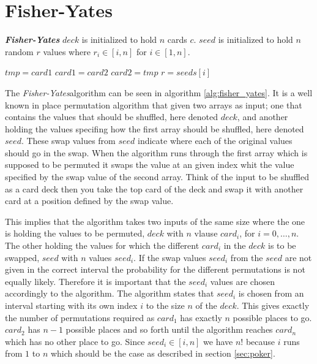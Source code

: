 \documentclass[twoside,11pt,openright]{report}
\newcommand{\FY}{\textit{Fisher-Yates}}
\begin{document}
\section{Fisher-Yates}
\label{sec:fisher-yates}
\begin{algorithm}
\caption{\textbf{\textit{Fisher-Yates}} \newline
    $deck$ is initialized to hold $n$ cards $c$. \newline
    $seed$ is initialized to hold $n$ random $r$ values where $r_i\in[i,n]$ for $i\in [1,n]$.
}
\label{alg:fisher_yates}

\begin{algorithmic}[1]
\State $tmp = card1$
\State $card1 = card2$
\State $card2 = tmp$
\EndFunction
\State
{}
\State $r = seeds[i]$
\State {}
\EndFor
\EndFunction
\end{algorithmic}
\end{algorithm}

The \FY algorithm can be seen in algorithm \ref{alg:fisher_yates}. It is a well known in place permutation algorithm that given two arrays as input; one that contains the values that should be shuffled, here denoted $deck$, and another holding the values specifing how the first array should be shuffled, here denoted $seed$. These swap values from $seed$ indicate where each of the original values should go in the swap. When the algorithm runs through the first array which is supposed to be permuted it swaps the value at an given index whit the value specified by the swap value of the second array. Think of the input to be shuffled as a card deck then you take the top card of the deck and swap it with another card at a position defined by the swap value.

This implies that the algorithm takes two inputs of the same size where the one is holding the values to be permuted, $deck$ with $n$ vlause $card_i$, for $i=0,\dots,n$. The other holding the values for which the different $card_i$ in the $deck$ is to be swapped, $seed$ with $n$ values $seed_i$. If the swap values $seed_i$ from the $seed$ are not given in the correct interval the probability for the different permutations is not equally likely. Therefore it is important that the $seed_i$ values are chosen accordingly to the algorithm. The algorithm states that $seed_i$ is chosen from an interval starting with its own index $i$ to the size $n$ of the $deck$. This gives exactly the number of permutations required as $card_1$ has exactly $n$ possible places to go. $card_2$ has $n-1$ possible places and so forth until the algorithm reaches $card_n$ which has no other place to go. Since $seed_i\in[i,n]$ we have $n!$ because $i$ runs from $1$ to $n$ which should be the case as described in section \ref{sec:poker}.
\end{document}
